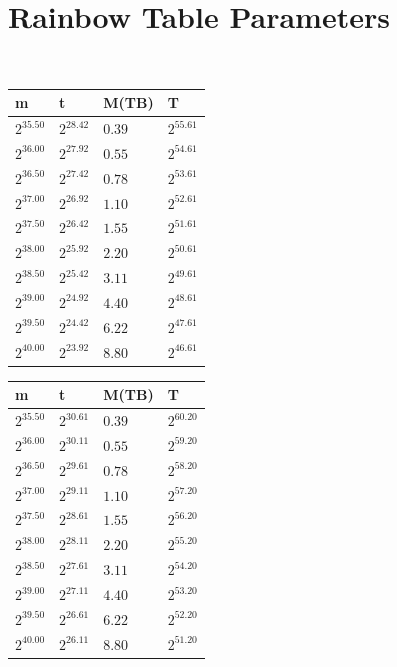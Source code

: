 \section{Rainbow Table Parameters}
\label{sec:rainbowtab}
\begin{table}[h!]\centering
 \ 
\begin{tabular}{llll}
m & t & M(TB) & T \\ \hline
$2^{35.50}$ & $2^{28.42}$ & $0.39$ & $2^{55.61}$ \\
$2^{36.00}$ & $2^{27.92}$ & $0.55$ & $2^{54.61}$ \\
$2^{36.50}$ & $2^{27.42}$ & $0.78$ & $2^{53.61}$ \\
$2^{37.00}$ & $2^{26.92}$ & $1.10$ & $2^{52.61}$ \\
$2^{37.50}$ & $2^{26.42}$ & $1.55$ & $2^{51.61}$ \\
$2^{38.00}$ & $2^{25.92}$ & $2.20$ & $2^{50.61}$ \\
$2^{38.50}$ & $2^{25.42}$ & $3.11$ & $2^{49.61}$ \\
$2^{39.00}$ & $2^{24.92}$ & $4.40$ & $2^{48.61}$ \\
$2^{39.50}$ & $2^{24.42}$ & $6.22$ & $2^{47.61}$ \\
$2^{40.00}$ & $2^{23.92}$ & $8.80$ & $2^{46.61}$ \\
\end{tabular}
\end{table}


\begin{table}[h!]\centering
  \begin{tabular}{llll}
    m & t & M(TB) & T \\ \hline
    $2^{35.50}$ & $2^{30.61}$ & $0.39$ & $2^{60.20}$ \\
    $2^{36.00}$ & $2^{30.11}$ & $0.55$ & $2^{59.20}$ \\
    $2^{36.50}$ & $2^{29.61}$ & $0.78$ & $2^{58.20}$ \\
    $2^{37.00}$ & $2^{29.11}$ & $1.10$ & $2^{57.20}$ \\
    $2^{37.50}$ & $2^{28.61}$ & $1.55$ & $2^{56.20}$ \\
    $2^{38.00}$ & $2^{28.11}$ & $2.20$ & $2^{55.20}$ \\
    $2^{38.50}$ & $2^{27.61}$ & $3.11$ & $2^{54.20}$ \\
    $2^{39.00}$ & $2^{27.11}$ & $4.40$ & $2^{53.20}$ \\
    $2^{39.50}$ & $2^{26.61}$ & $6.22$ & $2^{52.20}$ \\
    $2^{40.00}$ & $2^{26.11}$ & $8.80$ & $2^{51.20}$ \\
  \end{tabular}
\end{table}


